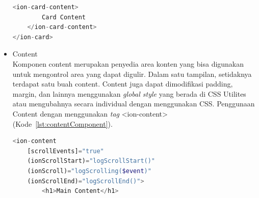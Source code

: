 \begin{itemize}
\begin{lstlisting}[language=php, label={lst:cardComponent}, caption=Potongan Kode Program dari Card Component]
	<ion-card-content>
		Card Content
	</ion-card-content>
</ion-card>
	\end{lstlisting} 
	\item Content\\
	Komponen content merupakan penyedia area konten yang bisa digunakan untuk mengontrol area yang dapat digulir. Dalam satu tampilan, setidaknya terdapat satu buah content. Content juga dapat dimodifikasi padding, margin, dan lainnya menggunakan {\it global style} yang berada di CSS Utilites atau mengubahnya secara individual dengan menggunakan CSS. Penggunaan Content dengan menggunakan {\it tag} <ion-content> (Kode~\ref{lst:contentComponent}).

	\begin{lstlisting}[language=php, label={lst:contentComponent}, caption=Potongan Kode Program dari Content Component]
<ion-content
	[scrollEvents]="true"
	(ionScrollStart)="logScrollStart()"
	(ionScroll)="logScrolling($event)"
	(ionScrollEnd)="logScrollEnd()">
		<h1>Main Content</h1>
			

\end{lstlisting}
\end{itemize}
